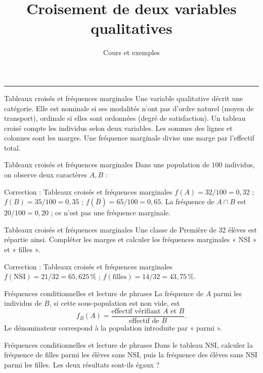\documentclass[aspectratio=169,10pt]{beamer}
\title{Croisement de deux variables qualitatives}
\subtitle{Cours et exemples}
\date{}
\author{}
\begin{document}
\begin{frame}[plain]
\vfill
{\inserttitle\par}
\medskip
{\insertsubtitle\par}
\medskip
{\rule{\textwidth}{.5pt}}
\vfill
\end{frame}
\begin{frame}{Tableaux croisés et fréquences marginales}
Une variable qualitative décrit une catégorie. Elle est nominale si ses modalités n'ont pas d'ordre naturel (moyen de transport), ordinale si elles sont ordonnées (degré de satisfaction).
Un tableau croisé compte les individus selon deux variables. Les sommes des lignes et colonnes sont les marges. Une fréquence marginale divise une marge par l'effectif total.
\end{frame}
\begin{frame}{Tableaux croisés et fréquences marginales}
Dans une population de \(100\) individus, on observe deux caractères \(A,B\) :
\end{frame}
\begin{frame}{Correction : Tableaux croisés et fréquences marginales}
\(f(A)=32/100=0{,}32\) ; \(f(B)=35/100=0{,}35\) ; \(f(\overline B)=65/100=0{,}65\). La fréquence de \(A\cap B\) est \(20/100=0{,}20\) ; ce n'est pas une fréquence marginale.
\end{frame}
\begin{frame}{Tableaux croisés et fréquences marginales}
Une classe de Première de \(32\) élèves est répartie ainsi. Compléter les marges et calculer les fréquences marginales « NSI » et « filles ».
\end{frame}
\begin{frame}{Correction : Tableaux croisés et fréquences marginales}
\(f(\mathrm{NSI})=21/32=65{,}625\,\%\) ; \(f(\mathrm{filles})=14/32=43{,}75\,\%\).
\end{frame}
\begin{frame}{Fréquences conditionnelles et lecture de phrases}
La fréquence de \(A\) parmi les individus de \(B\), si cette sous-population est non vide, est
\[f_B(A)=\dfrac{\text{effectif vérifiant }A\text{ et }B}{\text{effectif de }B}.\]
Le dénominateur correspond à la population introduite par « parmi ».
\end{frame}
\begin{frame}{Fréquences conditionnelles et lecture de phrases}
Dans le tableau NSI, calculer la fréquence de filles parmi les élèves sans NSI, puis la fréquence des élèves sans NSI parmi les filles. Les deux résultats sont-ils égaux ?
\end{frame}
\end{document}

